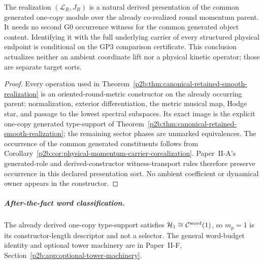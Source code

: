 \documentclass[12pt,a4paper]{article}
\begin{document}
\begin{corollary}
\label{p2b:cor:retained-smooth-realization-corealization}
The realization \((\mathcal L_R,J_R)\) is a natural derived presentation of
the common generated one-copy module over the already co-realized round
momentum parent.  It needs no second G0 occurrence witness for the common
generated object content.  Identifying it with the full underlying carrier
of every structured physical endpoint is conditional on the GP3
comparison certificate.  This conclusion actualizes neither an ambient
coordinate lift nor a physical kinetic operator; those are separate target
sorts.
\end{corollary}

\begin{proof}
Every operation used in Theorem~\ref{p2b:thm:canonical-retained-smooth-realization}
is an oriented-round-metric constructor on the already occurring parent:
normalization, exterior differentiation, the metric musical map, Hodge star,
and passage to the lowest spectral subspaces.  Its exact image is the
explicit one-copy generated type-support of
Theorem~\ref{p2b:thm:canonical-retained-smooth-realization}; the remaining
sector phases are unmarked equivalences.  The occurrence of the common
generated constituents follows from
Corollary~\ref{p2b:cor:physical-momentum-carrier-corealization}.  Paper~II-A's generated-role and
derived-constructor witness-transport rules therefore preserve occurrence in
this declared presentation sort.  No ambient coefficient or dynamical owner
appears in the constructor.
\end{proof}

\subparagraph{After-the-fact word classification.}
The already derived one-copy type-support satisfies
\(\mathcal H_1\cong\mathcal C^{\rm word}(1)\), so \(m_p=1\) is its
constructor-length descriptor and not a selector.  The general word-budget
identity and optional tower machinery are in
Paper~II-F, Section~\ref{p2b:app:optional-tower-machinery}.
\end{document}
